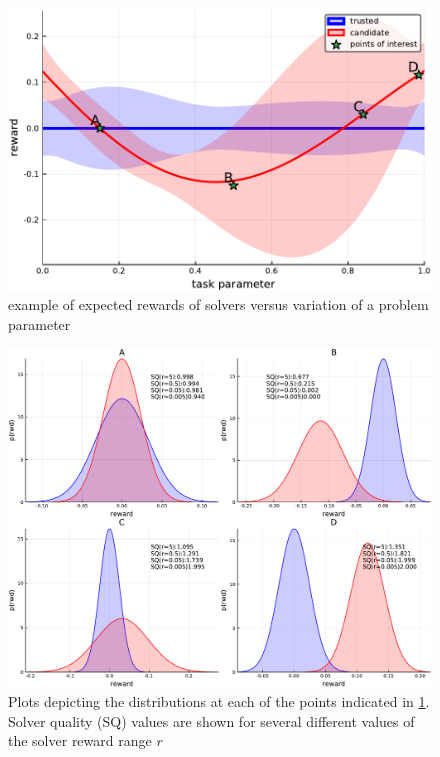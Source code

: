 \begin{figure}[htbp]
    \centering
    \includegraphics[width=0.9\linewidth]{Figures/p1}
    \caption{example of expected rewards of solvers versus variation of a problem parameter}
    \label{fig:sq_thry1}
\end{figure}

\begin{figure}[htbp]
    \centering
    \includegraphics[width=0.9\linewidth]{Figures/point_compare}
    \caption{Plots depicting the distributions at each of the points indicated in \ref{fig:sq_thry1}. Solver quality (SQ) values are shown for several different values of the solver reward range $r$}
    \label{fig:sq_thry2}
\end{figure}
